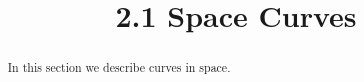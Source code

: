 \documentclass[handout]{ximera}
\title{2.1 Space Curves}
\begin{document}
\begin{abstract}
In this section we describe curves in space.
\end{abstract}

\maketitle
\end{document}

